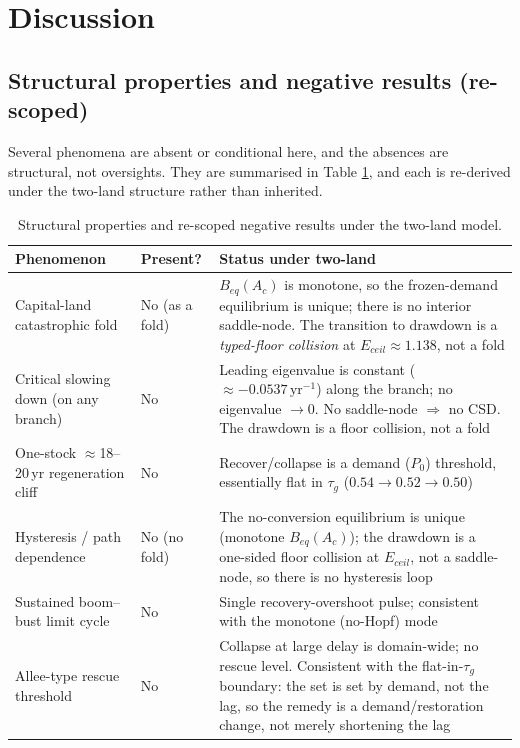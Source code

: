 \documentclass[11pt]{article}
\begin{document}
\section{Discussion}

\subsection{Structural properties and negative results (re-scoped)}

Several phenomena are absent or conditional here, and the absences are structural, not oversights. They are
summarised in Table \ref{tab:neg}, and each is re-derived under the two-land structure rather than inherited.

\begin{table}[htbp]
\centering
\small
\begin{tabularx}{\textwidth}{>{\raggedright\arraybackslash}X>{\raggedright\arraybackslash}X>{\raggedright\arraybackslash}X}
\toprule
Phenomenon & Present? & Status under two-land \\
\midrule
Capital-land catastrophic fold & No (as a fold) & $B_{eq}(A_c)$ is monotone, so the frozen-demand equilibrium is unique; there is no interior saddle-node. The transition to drawdown is a \emph{typed-floor collision} at $E_{ceil}\approx1.138$, not a fold \\
Critical slowing down (on any branch) & No & Leading eigenvalue is constant ($\approx-0.0537\,\text{yr}^{-1}$) along the branch; no eigenvalue $\to0$. No saddle-node $\Rightarrow$ no CSD. The drawdown is a floor collision, not a fold \\
One-stock $\approx$18--20\,yr regeneration cliff & No & Recover/collapse is a demand ($P_0$) threshold, essentially flat in $\tau_g$ ($0.54\to0.52\to0.50$) \\
Hysteresis / path dependence & No (no fold) & The no-conversion equilibrium is unique (monotone $B_{eq}(A_c)$); the drawdown is a one-sided floor collision at $E_{ceil}$, not a saddle-node, so there is no hysteresis loop \\
Sustained boom--bust limit cycle & No & Single recovery-overshoot pulse; consistent with the monotone (no-Hopf) mode \\
Allee-type rescue threshold & No & Collapse at large delay is domain-wide; no rescue level. Consistent with the flat-in-$\tau_g$ boundary: the set is set by demand, not the lag, so the remedy is a demand/restoration change, not merely shortening the lag \\
\bottomrule
\end{tabularx}
\caption{Structural properties and re-scoped negative results under the two-land model.}
\label{tab:neg}
\end{table}
\end{document}
